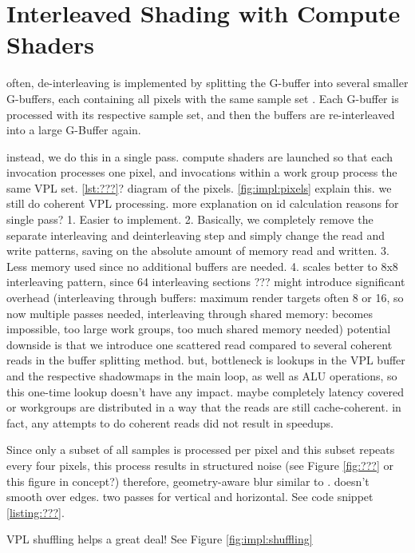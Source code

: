 \section{Interleaved Shading with Compute Shaders}
\label{sec:impl:interleavedShading}
\begin{outline}
\1 often, de-interleaving is implemented by splitting the G-buffer into several smaller G-buffers, each containing all pixels with the same sample set \cite{segovia2006non}. Each G-buffer is processed with its respective sample set, and then the buffers are re-interleaved into a large G-Buffer again.

\1 instead, we do this in a single pass. compute shaders are launched so that each invocation processes one pixel, and invocations within a work group process the same VPL set.
\1 \ref{lst:???}?
\1 diagram of the pixels. \ref{fig:impl:pixels} explain this. we still do coherent VPL processing.
\1 more explanation on id calculation
\1 reasons for single pass? 1. Easier to implement. 2. Basically, we completely remove the separate interleaving and deinterleaving step and simply change the read and write patterns, saving on the absolute amount of memory read and written. 3. Less memory used since no additional buffers are needed. 4. scales better to 8x8 interleaving pattern, since 64 interleaving sections ??? might introduce significant overhead (interleaving through buffers: maximum render targets often 8 or 16, so now multiple passes needed, interleaving through shared memory: becomes impossible, too large work groups, too much shared memory needed)
\1 potential downside is that we introduce one scattered read compared to several coherent reads in the buffer splitting method. but, bottleneck is lookups in the VPL buffer and the respective shadowmaps in the main loop, as well as ALU operations, so this one-time lookup doesn't have any impact. maybe completely latency covered or workgroups are distributed in a way that the reads are still cache-coherent.
\1 in fact, any attempts to do coherent reads did not result in speedups.


\1 Since only a subset of all samples is processed per pixel and this subset repeats every four pixels, this process results in structured noise (see Figure \ref{fig:???} or this figure in concept?)
\1 therefore, geometry-aware blur similar to \citet{laine2007incremental}. doesn't smooth over edges. two passes for vertical and horizontal. See code snippet \ref{listing:???}.

\1 VPL shuffling helps a great deal! See Figure \ref{fig:impl:shuffling}
\end{outline}

